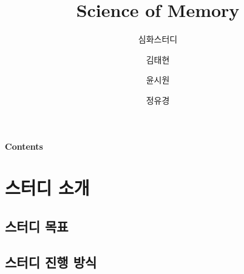 \documentclass{beamer}
\date{\displaydate{date}}
\title{Science of Memory}
\subtitle{심화스터디}
\author{김태현\and 윤시원\and 정유경}
\institute{BCSC 2025}
\date{\displaydate{date}}
\begin{document}
\begin{frame}
    \titlepage
\end{frame}

\begin{frame}{\textbf{Contents}}
  \tableofcontents
\end{frame}

\section{스터디 소개}
\subsection{스터디 목표}
\subsection{스터디 진행 방식}
\end{document}
